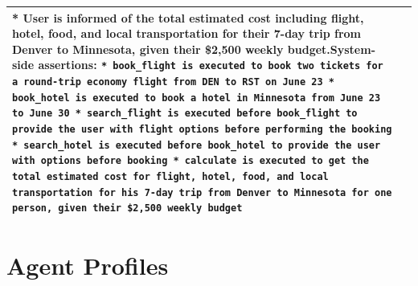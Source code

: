 \begin{table}[h!]
\begin{tabular}{p{2cm}p{10cm}}
{* User is informed of the total estimated cost including flight, hotel, food, and local transportation for their 7-day trip from Denver to Minnesota, given their \$2,500 weekly budget.}\newline \newline System-side assertions:\newline
\texttt{* book\_flight is executed to book two tickets for a round-trip economy flight from DEN to RST on June 23\newline
* book\_hotel is executed to book a hotel in Minnesota from June 23 to June 30\newline
* search\_flight is executed before book\_flight to provide the user with flight options before performing the booking\newline
* search\_hotel is executed before book\_hotel to provide the user with options before booking\newline
* calculate is executed to get the total estimated cost for flight, hotel, food, and local transportation for his 7-day trip from Denver to Minnesota for one person, given their \$2,500 weekly budget} \\
        \bottomrule
    \end{tabular}
\end{table}

\section{Agent Profiles}
\label{app:agent_profiles}

